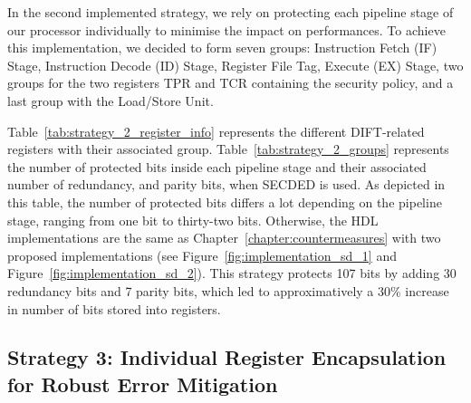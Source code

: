 In the second implemented strategy, we rely on protecting each pipeline stage of our processor individually to minimise the impact on performances. To achieve this implementation, we decided to form seven groups: Instruction Fetch (IF) Stage, Instruction Decode (ID) Stage, Register File Tag, Execute (EX) Stage, two groups for the two registers TPR and TCR containing the security policy, and a last group with the Load/Store Unit. 

Table~\ref{tab:strategy_2_register_info} represents the different DIFT-related registers with their associated group.
Table~\ref{tab:strategy_2_groups} represents the number of protected bits inside each pipeline stage and their associated number of redundancy, and parity bits, when SECDED is used. As depicted in this table, the number of protected bits differs a lot depending on the pipeline stage, ranging from one bit to thirty-two bits.
Otherwise, the HDL implementations are the same as Chapter~\ref{chapter:countermeasures} with two proposed implementations (see Figure~\ref{fig:implementation_sd_1} and Figure~\ref{fig:implementation_sd_2}). This strategy protects 107 bits by adding 30 redundancy bits and 7 parity bits, which led to approximatively a 30\% increase in number of bits stored into registers.

\subsection{Strategy 3: Individual Register Encapsulation for Robust Error Mitigation}

